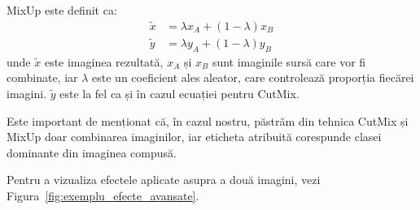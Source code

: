 MixUp este definit ca:
\begin{equation}
    \begin{aligned}
        \tilde{x} &= \lambda x_A + (1 - \lambda) x_B \\
        \tilde{y} &= \lambda y_A + (1 - \lambda) y_B
    \end{aligned}
    \label{eq:cutmix}
\end{equation}
unde $\tilde{x}$ este imaginea rezultată, $x_A$ și $x_B$ sunt imaginile sursă care vor fi combinate, iar $\lambda$ este un coeficient ales aleator, care controlează proporția fiecărei imagini. $\tilde{y}$ este la fel ca și în cazul ecuației pentru CutMix.

Este important de menționat că, în cazul nostru, păstrăm din tehnica CutMix și MixUp doar combinarea imaginilor, iar eticheta atribuită corespunde clasei dominante din imaginea compusă.

Pentru a vizualiza efectele aplicate asupra a două imagini, vezi Figura~\ref{fig:exemplu_efecte_avansate}.

